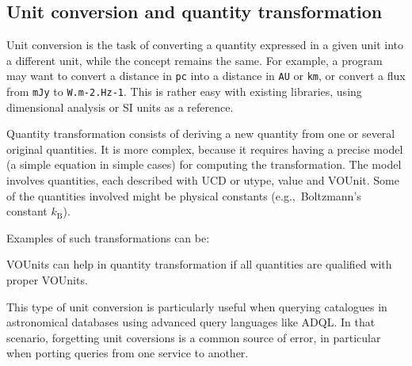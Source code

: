 \documentclass[11pt,a4paper]{ivoa}
\newcommand{\unit}[1]{\texttt{\small\color{orange}#1}}
\newcommand{\units}[1]{{\let~\thinspace
  \ifmmode
    \,\textrm{#1}%
  \else
    \nobreak$\,\mathrm{#1}$%
  \fi}}
\def\eg{e.g.,~}
\begin{document}
\subsection{Unit conversion and quantity transformation\label{sec:conversion}}

Unit conversion is the task of converting a quantity expressed
in a given unit into a different unit, while the concept remains the
same. For example, a program may want to convert a distance
in \unit{pc} into a distance in \unit{AU} or \unit{km}, or convert a
flux from \unit{mJy} to \unit{W.m-2.Hz-1}. This is rather easy with
existing libraries, using dimensional analysis or SI units as a
reference.

Quantity transformation consists of deriving a new quantity from one or several original
quantities. It is more complex, because it requires having a precise model 
(a simple equation in simple cases) for computing the transformation. The model involves
quantities, each described with UCD or utype, value and VOUnit. Some of the quantities
involved might be physical constants (\eg  Boltzmann's constant $k_{\mathrm{B}}$).

Examples of such transformations can be:

VOUnits can help in quantity transformation if all quantities are qualified with proper VOUnits.

This type of unit conversion is particularly useful when querying
catalogues in astronomical databases using advanced query languages like
ADQL.  In that scenario, forgetting unit coversions is a common source
of error, in particular when porting queries from one service to
another.
\end{document}
